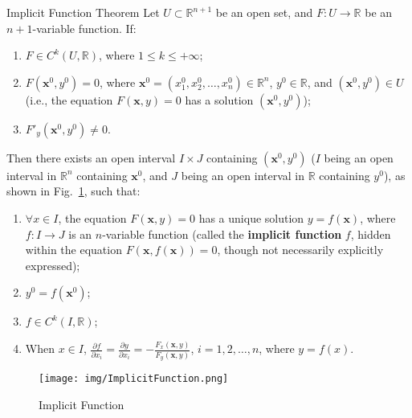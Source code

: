 \documentclass[11pt]{../../TexTemplate/elegantbook}
\begin{document}
\begin{theorem}{Implicit Function Theorem}
    Let \(U \subset \mathbb{R}^{n+1}\) be an open set, and \(F: U \to \mathbb{R}\) be an \(n+1\)-variable function. If:  
    \begin{enumerate}
        \item \(F \in C^k(U, \mathbb{R})\), where \(1 \leqslant k \leqslant +\infty\);
        \item \(F(\mathbf{x}^0, y^0) = 0\), 
            where \(\mathbf{x}^0 = (x_1^0, x_2^0, \dots, x_n^0) \in \mathbb{R}^n\), \(y^0 \in \mathbb{R}\), 
            and \((\mathbf{x}^0, y^0) \in U\) 
            (i.e., the equation \(F(\mathbf{x}, y) = 0\) has a solution \((\mathbf{x}^0, y^0)\));
        \item \(F'_y(\mathbf{x}^0, y^0) \neq 0\).
    \end{enumerate}

    Then there exists an open interval \(I \times J\) containing \((\mathbf{x}^0, y^0)\) 
    (\(I\) being an open interval in \(\mathbb{R}^n\) containing \(\mathbf{x}^0\), 
    and \(J\) being an open interval in \(\mathbb{R}\) containing \(y^0\)), 
    as shown in Fig.~\ref{fig:ImplicitFunction}, such that:  
    \begin{enumerate}
        \item \(\forall x \in I\), the equation \(F(\mathbf{x}, y) = 0\) has a unique solution \(y = f(\mathbf{x})\), 
            where \(f: I \to J\) is an \(n\)-variable function 
            (called the \textbf{implicit function} \(f\), hidden within the equation \(F(\mathbf{x}, f(\mathbf{x})) = 0\), 
            though not necessarily explicitly expressed);
        \item \(y^0 = f(\mathbf{x}^0)\);
        \item \(f \in C^k(I, \mathbb{R})\);
        \item When \(x \in I\), 
            \(\frac{\partial f}{\partial x_i} = \frac{\partial y}{\partial x_i} = -\frac{F_x(\mathbf{x}, y)}{F_y(\mathbf{x}, y)}\), 
            \(i = 1, 2, \dots, n\), where \(y = f(x)\).
    \end{enumerate}
\end{theorem}  
\begin{figure}[h]
    \centering
    \texttt{[image: img/ImplicitFunction.png]}
    \caption{Implicit Function}
    \label{fig:ImplicitFunction}
\end{figure}
\end{document}
